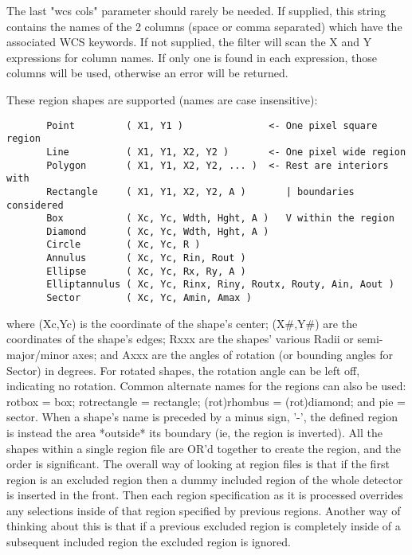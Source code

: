 \documentclass[11pt]{book}
\begin{document}
    The last "wcs cols" parameter should rarely be needed. If supplied,
    this  string contains the names of the 2 columns (space or comma
    separated) which have the associated WCS keywords. If not supplied,
    the filter  will scan the X  and Y expressions for column names.
    If only one is found in each  expression, those columns will be
    used, otherwise an error will be returned.

    These region shapes are supported (names are case insensitive):

\begin{verbatim}
       Point         ( X1, Y1 )               <- One pixel square region
       Line          ( X1, Y1, X2, Y2 )       <- One pixel wide region
       Polygon       ( X1, Y1, X2, Y2, ... )  <- Rest are interiors with
       Rectangle     ( X1, Y1, X2, Y2, A )       | boundaries considered
       Box           ( Xc, Yc, Wdth, Hght, A )   V within the region
       Diamond       ( Xc, Yc, Wdth, Hght, A )
       Circle        ( Xc, Yc, R )
       Annulus       ( Xc, Yc, Rin, Rout )
       Ellipse       ( Xc, Yc, Rx, Ry, A )
       Elliptannulus ( Xc, Yc, Rinx, Riny, Routx, Routy, Ain, Aout )
       Sector        ( Xc, Yc, Amin, Amax )
\end{verbatim}
    where (Xc,Yc) is  the coordinate of  the shape's center; (X\#,Y\#) are
    the coordinates  of the shape's edges;  Rxxx are the shapes' various
    Radii or semi-major/minor  axes; and Axxx  are the angles of rotation
    (or bounding angles for Sector) in degrees.  For rotated shapes, the
    rotation angle  can  be left  off, indicating  no rotation.   Common
    alternate  names for the regions  can also be  used: rotbox = box;
    rotrectangle = rectangle;  (rot)rhombus = (rot)diamond;  and pie
    = sector.  When a  shape's name is  preceded by a minus sign, '-',
    the defined region  is instead the area  *outside* its boundary (ie,
    the region is inverted).  All the shapes within a single region
    file are OR'd together to create the region, and the order is
    significant. The overall way of looking at region files is that if
    the first region is an excluded region then a dummy included region
    of the whole detector is inserted in the front. Then each region
    specification as it is processed overrides any selections inside of
    that region specified by previous regions. Another way of thinking
    about this is that if a previous excluded region is completely
    inside of a subsequent included region the excluded region is
    ignored.
\end{document}
